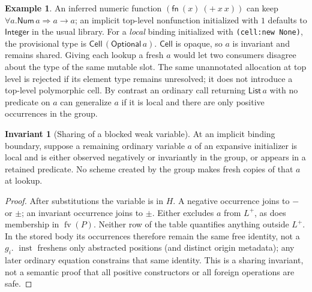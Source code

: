 \documentclass[11pt]{article}
\theoremstyle{definition}
\newtheorem{example}[theorem]{Example}
\newtheorem{invariant}[theorem]{Invariant}
\newcommand{\code}[1]{\texttt{#1}}
\newcommand{\fv}{\operatorname{fv}}
\newcommand{\Int}{\mathsf{Integer}}
\newcommand{\List}{\mathsf{List}}
\newcommand{\arr}{\mathbin{\to}}
\begin{document}
\begin{example}
An inferred numeric function $(\mathsf{fn}\ (x)\ (+\ x\ x))$ can keep
$\forall a.\mathsf{Num}\,a\Rightarrow a\arr a$; an implicit top-level
nonfunction initialized with $1$ defaults to $\Int$ in the usual library.
For a \emph{local} binding initialized with \code{(cell:new None)}, the provisional type
is $\mathsf{Cell}\,(\mathsf{Optional}\,a)$. $\mathsf{Cell}$ is opaque, so
$a$ is invariant and remains shared. Giving each lookup a fresh $a$
would let two consumers disagree about the type of the same mutable slot.
The same unannotated allocation at top level is rejected if its element
type remains unresolved; it does not introduce a top-level polymorphic cell.
By contrast an ordinary call returning $\List\,a$ with no predicate on
$a$ can generalize $a$ if it is local and there are only positive
occurrences in the group.
\end{example}

\begin{invariant}[Sharing of a blocked weak variable]
At an implicit binding boundary, suppose a remaining ordinary variable
$a$ of an expansive initializer is local and is either observed negatively
or invariantly in the group, or appears in a retained predicate. No scheme
created by the group makes fresh copies of that $a$ at lookup.
\end{invariant}
\begin{proof}
After substitutions the variable is in $H$. A negative occurrence joins
to $-$ or $\pm$; an invariant occurrence joins to $\pm$. Either excludes
$a$ from $L^+$, as does membership in $\fv(P)$. Neither row of the table
quantifies anything outside $L^+$. In the stored body its occurrences
therefore remain the same free identity, not a $g_i$.
$\operatorname{inst}$ freshens only abstracted positions (and distinct
origin metadata); any later ordinary equation constrains that same identity.
This is a sharing invariant, not a semantic proof that all positive
constructors or all foreign operations are safe.
\end{proof}
\end{document}
